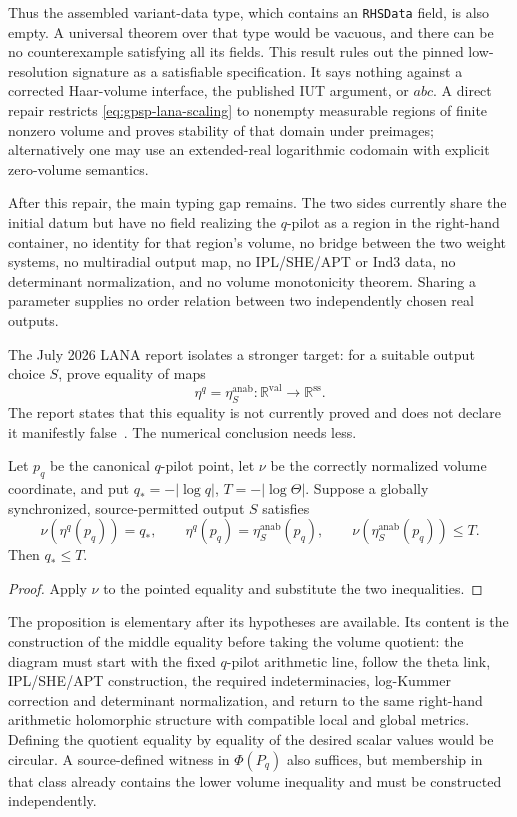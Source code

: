 Thus the assembled variant-data type, which contains an \texttt{RHSData}
field, is also empty.  A universal theorem over that type would be vacuous,
and there can be no counterexample satisfying all its fields.  This result
rules out the pinned low-resolution signature as a satisfiable specification.
It says nothing against a corrected Haar-volume interface, the published IUT
argument, or $abc$.  A direct repair restricts
\eqref{eq:gpsp-lana-scaling} to nonempty measurable regions of finite nonzero
volume and proves stability of that domain under preimages; alternatively one
may use an extended-real logarithmic codomain with explicit zero-volume
semantics.

After this repair, the main typing gap remains.  The two sides currently
share the initial datum but have no field realizing the $q$-pilot as a region
in the right-hand container, no identity for that region's volume, no bridge
between the two weight systems, no multiradial output map, no IPL/SHE/APT or
Ind3 data, no determinant normalization, and no volume monotonicity theorem.
Sharing a parameter supplies no order relation between two independently
chosen real outputs.

The July 2026 LANA report isolates a stronger target: for a suitable output
choice $S$, prove equality of maps
\[
        \eta^q=\eta_S^{\mathrm{anab}}:
        \mathbb R^{\mathrm{val}}\longrightarrow\mathbb R^{\mathrm{ss}}.
\]
The report states that this equality is not currently proved and does not
declare it manifestly false~\cite{LANA}.  The numerical conclusion needs
less.

\begin{proposition}
\label{prop:gpsp-pointed-hit}
Let $p_q$ be the canonical $q$-pilot point, let $\nu$ be the correctly
normalized volume coordinate, and put
$q_*=-|\log q|$, $T=-|\log\Theta|$.  Suppose a globally synchronized,
source-permitted output $S$ satisfies
\[
 \nu(\eta^q(p_q))=q_*,\qquad
 \eta^q(p_q)=\eta_S^{\mathrm{anab}}(p_q),\qquad
 \nu(\eta_S^{\mathrm{anab}}(p_q))\leq T.
\]
Then $q_*\leq T$.
\end{proposition}

\begin{proof}
Apply $\nu$ to the pointed equality and substitute the two inequalities.
\end{proof}

The proposition is elementary after its hypotheses are available.  Its
content is the construction of the middle equality before taking the volume
quotient: the diagram must start with the fixed $q$-pilot arithmetic line,
follow the theta link, IPL/SHE/APT construction, the required
indeterminacies, log-Kummer correction and determinant normalization, and
return to the same right-hand arithmetic holomorphic structure with compatible
local and global metrics.  Defining the quotient equality by equality of the
desired scalar values would be circular.  A source-defined witness in
$\Phi(P_q)$ also suffices, but membership in that class already contains the
lower volume inequality and must be constructed independently.

